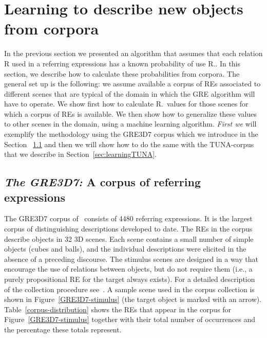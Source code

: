 \section{Learning to describe new objects from corpora}
\label{sec:learning}

In the previous section we presented an algorithm that assumes that each relation R 
used in a referring expressions has a known probability of use R.\puse. In this section, 
we describe how to calculate these probabilities from corpora.  
The general set up is the following: we assume available a corpus of REs associated 
to different scenes that are typical of the domain in which the GRE algorithm will have to operate.   
We show first how to calculate R.\puse\ values for those scenes for which a corpus of REs is available.  
We then show how to generalize these values to 
other scenes in the domain, using a machine learning algorithm. \textit{First we} will exemplify the methodology using 
the GRE3D7 corpus which we introduce in the Section ~\ref{sec:learningGRE} and then we will show how to do the same with the TUNA-corpus 
that we describe in Section~\ref{sec:learningTUNA}.

\subsection{\textit{The GRE3D7:} A corpus of referring expressions}
\label{sec:learningGRE}

The GRE3D7 corpus of~ consists of 4480 referring expressions. 
It is the largest corpus of distinguishing descriptions developed to date. 
The REs in the corpus describe objects in 32 3D scenes. Each scene contains a small number of simple objects 
(cubes and balls), and the individual descriptions were elicited in the absence of a preceding discourse. 
The stimulus scenes are designed in a way that encourage the use of relations between objects, but do not require them 
(i.e., a purely propositional RE for the target always exists). For a detailed description of the collection procedure 
see~\cite[Chapter 5]{viet:gene11}. A sample scene used in the corpus collection is shown in Figure~\ref{GRE3D7-stimulus} 
(the target object is marked with an arrow). Table~\ref{corpus-distribution} shows the REs that appear in the corpus for 
Figure~\ref{GRE3D7-stimulus} together with their total number of occurrences and the percentage these totals represent.  

